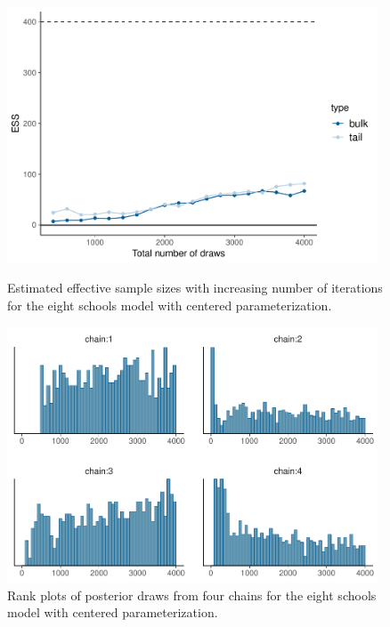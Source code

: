 \documentclass[american,]{article}
\theoremstyle{definition}
\begin{document}
\begin{figure}[tp]
  \centering
  \begin{minipage}{0.48\textwidth}
  \includegraphics[width=0.98\textwidth]{graphics/change-ess-fit-cp-1.pdf}
  \caption{Estimated effective sample sizes with increasing number of iterations
  for the eight schools model with centered parameterization.}
  \label{fig:change-ess-fit-cp-1}
\end{minipage}
\hfill
  \begin{minipage}{0.48\textwidth}
  \includegraphics[width=0.98\textwidth]{graphics/hist-fit-cp-1.pdf}
  \caption{Rank plots of posterior draws from four chains for the eight schools 
  model with centered parameterization.}
  \label{fig:hist-fit-cp-1}
\end{minipage}
\end{figure}
\end{document}
